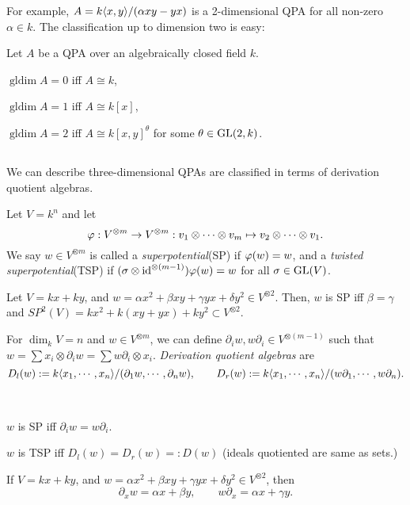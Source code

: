 \documentclass{../../../small}
\newcommand{\gldim}{\operatorname{gldim}}
\begin{document}
For example, $A=k\langle x,y\rangle/(\alpha xy-yx)$ is a 2-dimensional QPA for all non-zero $\alpha\in k$.
The classification up to dimension two is easy:
\begin{lem}
Let $A$ be a QPA over an algebraically closed field $k$.
\begin{parts}
\item $\gldim A=0$ iff $A\cong k$,
\item $\gldim A=1$ iff $A\cong k[x]$,
\item $\gldim A=2$ iff $A\cong k[x,y]^\theta$ for some $\theta\in\mathrm{GL}(2,k)$.
\end{parts}
\end{lem}


\subsection{}
We can describe three-dimensional QPAs are classified in terms of derivation quotient algebras.
\begin{defn}
Let $V=k^n$ and let
\[\varphi:V^{\otimes m}\to V^{\otimes m}:v_1\otimes\cdots\otimes v_m\mapsto v_2\otimes\cdots\otimes v_1.\]
We say $w\in V^{\otimes m}$ is called a \emph{superpotential}(SP) if $\varphi(w)=w$, and a \emph{twisted superpotential}(TSP) if $(\sigma\otimes\operatorname{id}^{\otimes(m-1)})\varphi(w)=w$ for all $\sigma\in\mathrm{GL}(V)$.
\end{defn}
\begin{ex}
Let $V=kx+ky$, and $w=\alpha x^2+\beta xy+\gamma yx+\delta y^2\in V^{\otimes 2}$.
Then, $w$ is SP iff $\beta=\gamma$ and $SP^2(V)=kx^2+k(xy+yx)+ky^2\subset V^{\otimes2}$.
\end{ex}
\begin{defn}
For $\dim_kV=n$ and $w\in V^{\otimes m}$, we can define $\partial_iw,w\partial_i\in V^{\otimes(m-1)}$ such that $w=\sum x_i\otimes\partial_iw=\sum w\partial_i\otimes x_i$.
\emph{Derivation quotient algebras} are
\[D_l(w):=k\langle x_1,\cdots,x_n\rangle/(\partial_1w,\cdots,\partial_nw),\qquad D_r(w):=k\langle x_1,\cdots,x_n\rangle/(w\partial_1,\cdots,w\partial_n).\]
\end{defn}
\begin{lem}
\,
\begin{parts}
\item $w$ is SP iff $\partial_iw=w\partial_i$.
\item $w$ is TSP iff $D_l(w)=D_r(w)=:D(w)$ (ideals quotiented are same as sets.)
\end{parts}
\end{lem}
\begin{ex}
If $V=kx+ky$, and $w=\alpha x^2+\beta xy+\gamma yx+\delta y^2\in V^{\otimes 2}$, then
\[\partial_xw=\alpha x+\beta y,\qquad w\partial_x=\alpha x+\gamma y.\]
\end{ex}
\end{document}
